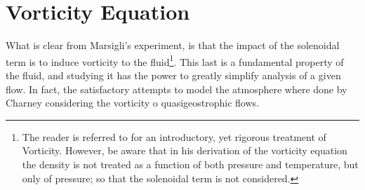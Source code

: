 \section{Vorticity Equation}
\label{s:vorticity}

What is clear from Marsigli's experiment, is that the impact of the
solenoidal term is to induce vorticity to the fluid\footnote{The reader
is referred to  for an introductory, yet rigorous
treatment of Vorticity. However, be aware that in his derivation of the
vorticity equation the density is not treated as a function of both
pressure and temperature, but only of pressure; so that the solenoidal
term is not considered.}. This last is a fundamental property of the
fluid, and studying it has the power to greatly simplify analysis of a
given flow. In fact, the satisfactory attempts to model the atmosphere
where done by Charney considering the vorticity o quasigeostrophic flows.

